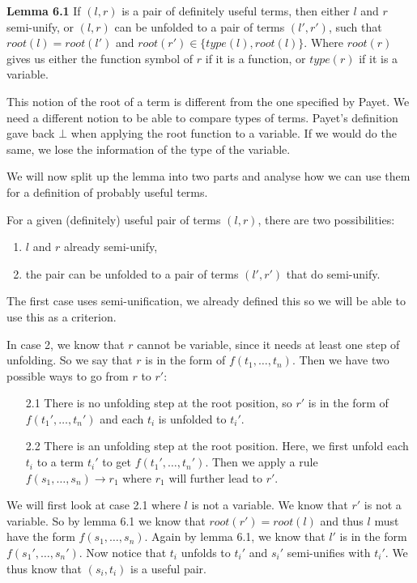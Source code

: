 \textbf{Lemma 6.1} If $(l, r)$ is a pair of definitely useful terms, then either $l$ and $r$ semi-unify, or $(l, r)$ can be unfolded to a pair of terms $(l', r')$, such that $\textit{root}(l) = \textit{root}(l')$ and $\textit{root}(r') \in \{ \textit{type}(l), \textit{root}(l) \}$. Where $\textit{root}(r)$ gives us either the function symbol of $r$ if it is a function, or $\textit{type}(r)$ if it is a variable. 

This notion of the root of a term is different from the one specified by Payet. We need a different notion to be able to compare types of terms. Payet's definition gave back $\bot$ when applying the root function to a variable. If we would do the same, we lose the information of the type of the variable.

We will now split up the lemma into two parts and analyse how we can use them for a definition of probably useful terms. 

For a given (definitely) useful pair of terms $(l, r)$, there are two possibilities: 
\begin{enumerate}
    \itemsep 0em
    \item $l$ and $r$ already semi-unify,
    \item the pair can be unfolded to a pair of terms $(l', r')$ that do semi-unify.
\end{enumerate} 
The first case uses semi-unification, we already defined this so we will be able to use this as a criterion. 

In case 2, we know that $r$ cannot be variable, since it needs at least one step of unfolding. So we say that $r$ is in the form of $f(t_1, \dots, t_n)$. Then we have two possible ways to go from $r$ to $r'$: 
\begin{enumerate}
    \itemsep 0em
    \item[2.1] There is no unfolding step at the root position, so $r'$ is in the form of $f(t_1', \dots, t_n')$ and each $t_i$ is unfolded to $t_i'$. 
    \item[2.2] There is an unfolding step at the root position. Here, we first unfold each $t_i$ to a term $t_i'$ to get $f(t_1', \dots, t_n')$. Then we apply a rule $f(s_1, \dots, s_n) \rightarrow r_1$ where $r_1$ will further lead to $r'$. 
\end{enumerate}
We will first look at case 2.1 where $l$ is not a variable. We know that $r'$ is not a variable. So by lemma 6.1 we know that $\textit{root}(r') = \textit{root}(l)$ and thus $l$ must have the form $f(s_1, \dots, s_n)$. Again by lemma 6.1, we know that $l'$ is in the form $f(s_1', \dots, s_n')$. Now notice that $t_i$ unfolds to $t_i'$ and $s_i'$ semi-unifies with $t_i'$. We thus know that $(s_i, t_i)$ is a useful pair. 

